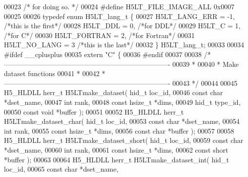 \begin{DoxyCode}
00023 \textcolor{comment}{/* for doing so.                                                             */} 
00024 \textcolor{preprocessor}{#define H5LT\_FILE\_IMAGE\_ALL          0x0007}
00025 
00026 \textcolor{keyword}{typedef} \textcolor{keyword}{enum} H5LT\_lang\_t \{
00027     H5LT\_LANG\_ERR = -1, \textcolor{comment}{/*this is the first*/}
00028     H5LT\_DDL      = 0,  \textcolor{comment}{/*for DDL*/}
00029     H5LT\_C        = 1,  \textcolor{comment}{/*for C*/}
00030     H5LT\_FORTRAN  = 2,  \textcolor{comment}{/*for Fortran*/}
00031     H5LT\_NO\_LANG  = 3   \textcolor{comment}{/*this is the last*/}
00032 \} H5LT\_lang\_t;
00033 
00034 \textcolor{preprocessor}{#ifdef \_\_cplusplus}
00035 \textcolor{keyword}{extern} \textcolor{stringliteral}{"C"} \{
00036 \textcolor{preprocessor}{#endif}
00037 
00038 \textcolor{comment}{/*-------------------------------------------------------------------------}
00039 \textcolor{comment}{ *}
00040 \textcolor{comment}{ * Make dataset functions}
00041 \textcolor{comment}{ *}
00042 \textcolor{comment}{ *-------------------------------------------------------------------------}
00043 \textcolor{comment}{ */}
00044 
00045 H5\_HLDLL herr\_t  H5LTmake\_dataset( hid\_t loc\_id,
00046                          \textcolor{keyword}{const} \textcolor{keywordtype}{char} *dset\_name,
00047                          \textcolor{keywordtype}{int} rank,
00048                          \textcolor{keyword}{const} hsize\_t *dims,
00049                          hid\_t type\_id,
00050                          \textcolor{keyword}{const} \textcolor{keywordtype}{void} *buffer );
00051 
00052 H5\_HLDLL herr\_t  H5LTmake\_dataset\_char( hid\_t loc\_id,
00053                               \textcolor{keyword}{const} \textcolor{keywordtype}{char} *dset\_name,
00054                               \textcolor{keywordtype}{int} rank,
00055                               \textcolor{keyword}{const} hsize\_t *dims,
00056                               \textcolor{keyword}{const} \textcolor{keywordtype}{char} *buffer );
00057 
00058 H5\_HLDLL herr\_t  H5LTmake\_dataset\_short( hid\_t loc\_id,
00059                                \textcolor{keyword}{const} \textcolor{keywordtype}{char} *dset\_name,
00060                                \textcolor{keywordtype}{int} rank,
00061                                \textcolor{keyword}{const} hsize\_t *dims,
00062                                \textcolor{keyword}{const} \textcolor{keywordtype}{short} *buffer );
00063 
00064 H5\_HLDLL herr\_t  H5LTmake\_dataset\_int( hid\_t loc\_id,
00065                              \textcolor{keyword}{const} \textcolor{keywordtype}{char} *dset\_name,

\end{DoxyCode}
